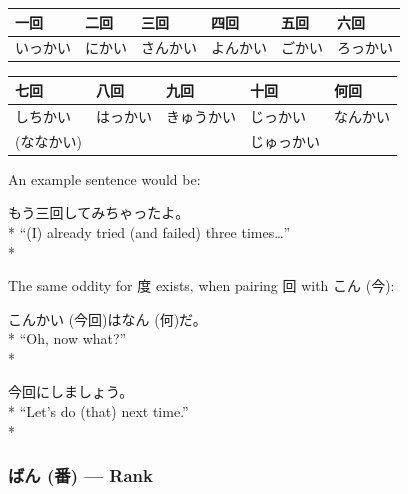 \documentclass[11pt, b5paper, twoside, openright, onecolumn]{book}
\makeatletter
\newcommand*{\rubystack}[2]{{\relscale{0.5}%
  \begin{tabular}[b]{@{}c@{}}%
    {#1}\\%
   {\textscale{2}{#2}}%
  \end{tabular}}%
}
\DeclareRobustCommand*{\ruby}[2]{%
  \mbox{%
    \setlength{\parskip}{0ex}%
    \BeginAccSupp{method=pdfstringdef,ActualText={#1}}%
      \rubystack{\phantom{#2}}{#1}%
      \llap{%
        \rubystack{#2}{\phantom{#1}}%
      }%
    \EndAccSupp{}%
  }%
}
\renewcommand*{\ruby}[2]{#2 (#1)}%
\newenvironment{exampleblock}{
\setlength{\parindent}{0.6in}
\begin{minipage}[t]{\dimexpr\textwidth-\parindent}}
{\end{minipage}}
\newenvironment{mytabular}[1]{\noindent\hspace{0.4in}
\begin{tabular}[h]{#1}}{\end{tabular}}
\makeatother
\begin{document}
\vspace{0.5cm}
\smaller
\begin{mytabular}{| l  l  l  l  l  l |}\hline 
\rule{0pt}{2.4ex}一回 & 二回 & 三回 & 四回 & 五回 & 六回\\ 
\hline
\rule{0pt}{2.4ex}いっかい & にかい & さんかい & よんかい & ごかい & ろっかい\\ 
\hline 
\end{mytabular}
\larger
\vspace{0.5cm}

\smaller
\begin{mytabular}{| l  l  l  l  l |}\hline 
\rule{0pt}{2.4ex}七回 & 八回 & 九回 & 十回 & 何回\\ 
\hline
\rule{0pt}{2.4ex}しちかい & はっかい & きゅうかい & じっかい & なんかい\\ 
\rule{0pt}{2.4ex}(ななかい) &  &  & じゅっかい & \\ 
\hline 
\end{mytabular}
\larger
\vspace{0.5cm}


An example sentence would be:

\vspace{0.4cm}
\begin{exampleblock}
もう三回してみちゃったよ。 \\* 
“(I) already tried (and failed) three times…” \\* 
\end{exampleblock}
\vspace{0.2cm}

The same oddity for 度 exists‚ when pairing 回 with \ruby{今}{こん}:

\vspace{0.4cm}
\begin{exampleblock}
\ruby{今回}{こんかい}は\ruby{何}{なん}だ。 \\* 
“Oh‚ now what?” \\* 
\end{exampleblock}
\vspace{0.2cm}

\begin{exampleblock}
今回にしましょう。 \\* 
“Let’s do (that) next time.” \\* 
\end{exampleblock}
\subsubsection{\ruby{番}{ばん} — Rank}
\end{document}
